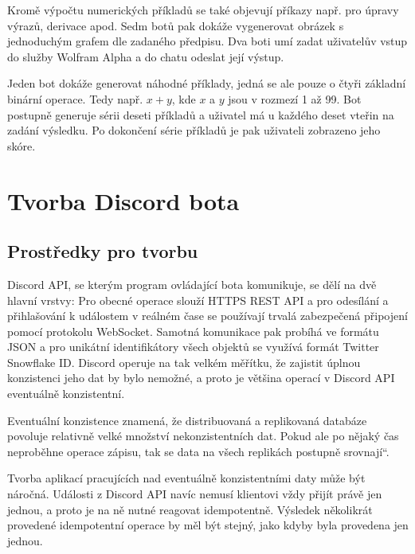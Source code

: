 \documentclass[FM]{tulthesis}
\begin{document}
	Kromě výpočtu numerických příkladů se také objevují příkazy např. pro úpravy výrazů, derivace apod. Sedm botů pak dokáže vygenerovat obrázek s jednoduchým grafem dle zadaného předpisu. Dva boti umí zadat uživatelův vstup do služby Wolfram Alpha a do chatu odeslat její výstup.
	
	Jeden bot dokáže generovat náhodné příklady, jedná se ale pouze o čtyři základní binární operace. Tedy např. $x+y$, kde $x$ a $y$ jsou v rozmezí 1 až 99. Bot postupně generuje sérii deseti příkladů a uživatel má u každého deset vteřin na zadání výsledku. Po dokončení série příkladů je pak uživateli zobrazeno jeho skóre.
	
	
	\chapter{Tvorba Discord bota}
	
	\section{Prostředky pro tvorbu}
	
	Discord API, se kterým program ovládající bota komunikuje, se dělí na dvě hlavní vrstvy: Pro obecné operace slouží HTTPS REST API a pro odesílání a přihlašování k událostem v reálném čase se používají trvalá zabezpečená připojení pomocí protokolu WebSocket. Samotná komunikace pak probíhá ve formátu JSON a pro unikátní identifikátory všech objektů se využívá formát Twitter Snowflake ID.	Discord operuje na tak velkém měřítku, že zajistit úplnou konzistenci jeho dat by bylo nemožné, a proto je většina operací v Discord API eventuálně konzistentní. \cite{doc_Discord}
	
	Eventuální konzistence znamená, že distribuovaná a replikovaná databáze povoluje relativně velké množství nekonzistentních dat. Pokud ale po nějaký čas neproběhne operace zápisu, tak se data na všech replikách postupně \quotedblbase srovnají\textquotedblleft. \cite{book_distributedSystems4}
	
	Tvorba aplikací pracujících nad eventuálně konzistentními daty může být náročná. Události z Discord API navíc nemusí klientovi vždy přijít právě jen jednou, a proto je na ně nutné reagovat idempotentně. Výsledek několikrát provedené idempotentní operace by měl být stejný, jako kdyby byla provedena jen jednou. \cite{book_distributedSystemsUnderstanding}
	
\end{document}

